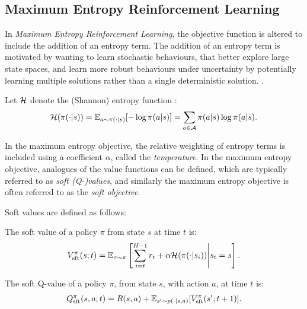     \subsection{Maximum Entropy Reinforcement Learning}
    \label{sec:2-2-1-merl}

        In \textit{Maximum Entropy Reinforcement Learning}, the objective function is altered to include the addition of an entropy term. The addition of an entropy term is motivated by wanting to learn stochastic behaviours, that better explore large state spaces, and learn more robust behaviours under uncertainty by potentially learning multiple solutions rather than a single deterministic solution. . 
        
        Let $\mathcal{H}$ denote the (Shannon) entropy function :
        \begin{align}
            \mathcal{H}(\pi(\cdot|s)) = \mathbb{E}_{a\sim\pi(\cdot|s)}[-\log \pi(a|s)] = \sum_{a\in\mathcal{A}} \pi(a|s) \log \pi(a|s). \label{eq:shannon_entropy_def}
        \end{align}

        In the maximum entropy objective, the relative weighting of entropy terms is included using a coefficient $\alpha$, called the \textit{temperature}. In the maximum entropy objective, analogues of the value functions can be defined, which are typically referred to as \textit{soft (Q-)values}, and similarly the maximum entropy objective is often referred to as the \textit{soft objective}.

        Soft values are defined as follows:
        \begin{defn}
            \label{def:sft_value}
            \label{def:sft_q_value}
            The \textnormal{soft value} of a policy $\pi$ from state $s$ at time $t$ is:
            \begin{align}
                V_{{\textnormal{sft}}}^{\pi}(s;t) = \mathbb{E}_{\tau\sim\pi}\left[\sum_{i=t}^{H-1} r_t + \alpha\mathcal{H}(\pi(\cdot|s_i)) \Bigg| s_t=s \right]. \label{eq:sft_value_fn_def}
            \end{align} 

            The \textnormal{soft Q-value} of a policy $\pi$, from state $s$, with action $a$, at time $t$ is:
            \begin{align}
                Q_{{\textnormal{sft}}}^{\pi}(s,a;t) = R(s,a) + \mathbb{E}_{s'\sim p(\cdot|s,a)} [V_{{\textnormal{sft}}}^{\pi}(s';t+1)]. \label{eq:sft_q_value_fn_def}
            \end{align} 
        \end{defn}

